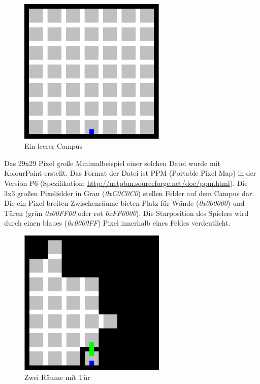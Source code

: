 \begin{figure}[h]
	\begin{center}
		\includegraphics[width=7cm, height=7cm]{kapitel/ui/empty.png}
	\end{center}
	\caption{Ein leerer Campus}
	\label{fig:empty_campus}
\end{figure}

Das 29x29 Pixel große Minimalbeispiel einer solchen Datei wurde mit KolourPaint erstellt. Das Format der 
Datei ist PPM (Portable Pixel Map) in der Version P6 
(Spezifikation: \url{http://netpbm.sourceforge.net/doc/ppm.html}).
Die 3x3 großen Pixelfelder in Grau (\textit{0xC0C0C0}) stellen Felder auf dem Campus dar.
Die ein Pixel breiten Zwischenräume bieten Platz für Wände (\textit{0x000000}) und Türen (grün 
\textit{0x00FF00} oder rot \textit{0xFF0000}). Die Starposition des Spielers
wird durch einen blaues (\textit{0x0000FF}) Pixel innerhalb eines Feldes verdeutlicht. 

\begin{figure}[h]
	\begin{center}
		\includegraphics[width=7cm, height=7cm]{kapitel/ui/room_door_fancy.png}
	\end{center}
	\caption{Zwei Räume mit Tür}
	\label{fig:room_door_fancy}
\end{figure}

